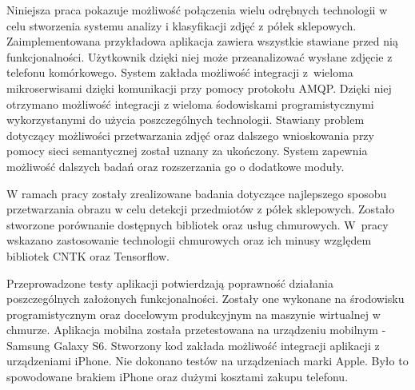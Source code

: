 Niniejsza praca pokazuje możliwość połączenia wielu odrębnych technologii w celu stworzenia systemu analizy i klasyfikacji zdjęć z półek sklepowych. Zaimplementowana przykładowa aplikacja zawiera wszystkie stawiane przed nią funkcjonalności. Użytkownik dzięki niej może przeanalizować wysłane zdjęcie z telefonu komórkowego. System zakłada możliwość integracji z~wieloma mikroserwisami dzięki komunikacji przy pomocy protokołu AMQP. Dzięki niej otrzymano możliwość integracji z wieloma śodowiskami programistycznymi wykorzystanymi do użycia poszczególnych technologii. Stawiany problem dotyczący możliwości przetwarzania zdjęć oraz dalszego wnioskowania przy pomocy sieci semantycznej został uznany za ukończony. System zapewnia możliwość dalszych badań oraz rozszerzania go o dodatkowe moduły.

W ramach pracy zostały zrealizowane badania dotyczące najlepszego sposobu przetwarzania obrazu w celu detekcji przedmiotów z półek sklepowych. Zostało stworzone porównanie dostępnych bibliotek oraz usług chmurowych. W~pracy wskazano zastosowanie technologii chmurowych oraz ich minusy względem bibliotek CNTK oraz Tensorflow. 

Przeprowadzone testy aplikacji potwierdzają poprawność działania poszczególnych założonych funkcjonalności. Zostały one wykonane na środowisku programistycznym oraz docelowym produkcyjnym na maszynie wirtualnej w chmurze. Aplikacja mobilna została przetestowana na urządzeniu mobilnym - Samsung Galaxy S6. Stworzony kod zakłada możliwość integracji aplikacji z urządzeniami iPhone. Nie dokonano testów na urządzeniach marki Apple. Było to spowodowane brakiem iPhone oraz dużymi kosztami zakupu telefonu.